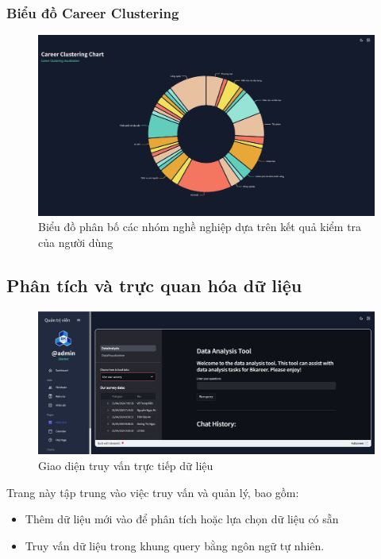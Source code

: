 \subsubsection{Biểu đồ Career Clustering}
\begin{figure}[H]
    \centering
    \includegraphics[width=0.75\linewidth]{images/CCChart.png}
    \vspace{0.6cm}
    \caption{Biểu đồ phân bố các nhóm nghề nghiệp dựa trên kết quả kiểm tra của người dùng}
\end{figure}

\subsection{Phân tích và trực quan hóa dữ liệu}
\label{sec:data_analysis}
\begin{figure}[H]
    \centering
    \includegraphics[width=0.75\linewidth]{images/admin.jpg}
    \vspace{0.6cm}
    \caption{Giao diện truy vấn trực tiếp dữ liệu}
\end{figure}

Trang này tập trung vào việc truy vấn và quản lý, bao gồm:
\begin{itemize}
    \item Thêm dữ liệu   mới vào để phân tích hoặc lựa chọn dữ liệu có sẵn
    \item Truy vấn dữ liệu trong khung query bằng ngôn ngữ tự nhiên.
\end{itemize}

